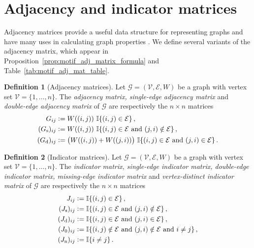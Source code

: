 \documentclass[12pt]{ociamthesis}
\theoremstyle{plain}
\theoremstyle{definition}
\newtheorem{definition}{Definition}[chapter]
\theoremstyle{remark}
\newcommand\bb[1]{\mathbb{#1}}
\newcommand\ca[1]{\mathcal{#1}}
\begin{document}
\section{Adjacency and indicator matrices}
\label{sec:graphs_adj_and_ind_matrices}

Adjacency matrices provide a useful data structure for representing graphs and
have many uses in calculating graph properties \cite{bapat2010graphs}.  We
define several variants of the adjacency matrix, which appear in
Proposition~\ref{prop:motif_adj_matrix_formula} and
Table~\ref{tab:motif_adj_mat_table}.

\begin{definition}[Adjacency matrices]
  Let $\ca{G} = (\ca{V,E},W)$ be a graph with vertex set $\ca{V} = \{1, \ldots,
  n \}$. The \emph{adjacency matrix, single-edge adjacency matrix} and
  \emph{double-edge adjacency matrix} of $\ca{G}$ are respectively the $n
  \times n$ matrices
  \begin{align*}
    G_{i j} &\vcentcolon= W((i,j)) \ \bb{I} \{ (i,j) \in \ca{E} \}\,, \\
    (G_\mathrm{s})_{i j} &\vcentcolon= W((i,j)) \ \bb{I} \{ (i,j) \in \ca{E}
    \textrm{ and } (j,i) \notin \ca{E} \}\,, \\
    (G_\mathrm{d})_{i j} &\vcentcolon= \big( W((i,j)) + W((j,i)) \big) \ \bb{I}
    \{ (i,j) \in \ca{E} \textrm{ and } (j,i) \in \ca{E} \}\,.
  \end{align*}
\end{definition}

\begin{definition}[Indicator matrices]
  Let $\ca{G} = (\ca{V,E},W)$ be a graph with vertex set $\ca{V} = \{1, \ldots,
  n \}$. The \emph{indicator matrix, single-edge indicator matrix, double-edge
  indicator matrix, missing-edge indicator matrix} and \emph{vertex-distinct
  indicator matrix} of $\ca{G}$ are respectively the $n \times n$ matrices
  \begin{align*}
    J_{i j} &\vcentcolon= \bb{I} \{ (i,j) \in \ca{E} \}\,, \\
    (J_\mathrm{s})_{i j} &\vcentcolon= \bb{I} \{ (i,j) \in \ca{E} \textrm{ and }
    (j,i) \notin \ca{E} \}\,, \\
    (J_\mathrm{d})_{i j} &\vcentcolon= \bb{I} \{ (i,j) \in \ca{E} \textrm{ and }
    (j,i) \in \ca{E} \}\,, \\
    (J_0)_{i j} &\vcentcolon= \bb{I} \{ (i,j) \notin \ca{E} \textrm{ and } (j,i)
    \notin \ca{E} \textrm{ and } i \neq j \}\,, \\
    (J_\mathrm{n})_{i j} &\vcentcolon= \bb{I} \{ i \neq j \}\,.
  \end{align*}
\end{definition}
\end{document}
